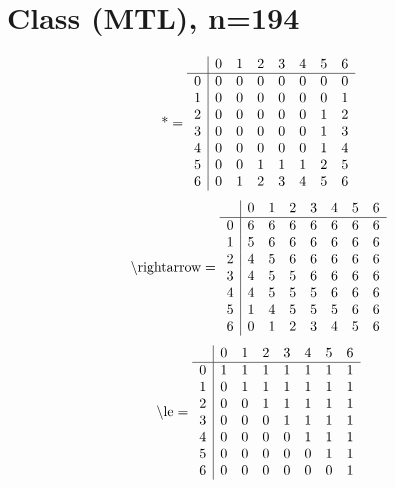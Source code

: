 \documentclass[11pt]{article}
\begin{document}
\section{Class (MTL), n=194}
\[\text{*} = 
\begin{array}{r | r r r r r r r}
 & 0 & 1 & 2 & 3 & 4 & 5 & 6 \\ \hline
0 & 0 & 0 & 0 & 0 & 0 & 0 & 0 \\
1 & 0 & 0 & 0 & 0 & 0 & 0 & 1 \\
2 & 0 & 0 & 0 & 0 & 0 & 1 & 2 \\
3 & 0 & 0 & 0 & 0 & 0 & 1 & 3 \\
4 & 0 & 0 & 0 & 0 & 0 & 1 & 4 \\
5 & 0 & 0 & 1 & 1 & 1 & 2 & 5 \\
6 & 0 & 1 & 2 & 3 & 4 & 5 & 6 \\
\end{array}
\]
\[\text{\textbackslash rightarrow} = 
\begin{array}{r | r r r r r r r}
 & 0 & 1 & 2 & 3 & 4 & 5 & 6 \\ \hline
0 & 6 & 6 & 6 & 6 & 6 & 6 & 6 \\
1 & 5 & 6 & 6 & 6 & 6 & 6 & 6 \\
2 & 4 & 5 & 6 & 6 & 6 & 6 & 6 \\
3 & 4 & 5 & 5 & 6 & 6 & 6 & 6 \\
4 & 4 & 5 & 5 & 5 & 6 & 6 & 6 \\
5 & 1 & 4 & 5 & 5 & 5 & 6 & 6 \\
6 & 0 & 1 & 2 & 3 & 4 & 5 & 6 \\
\end{array}
\]
\[\text{\textbackslash le} = 
\begin{array}{r | r r r r r r r}
 & 0 & 1 & 2 & 3 & 4 & 5 & 6 \\ \hline
0 & 1 & 1 & 1 & 1 & 1 & 1 & 1 \\
1 & 0 & 1 & 1 & 1 & 1 & 1 & 1 \\
2 & 0 & 0 & 1 & 1 & 1 & 1 & 1 \\
3 & 0 & 0 & 0 & 1 & 1 & 1 & 1 \\
4 & 0 & 0 & 0 & 0 & 1 & 1 & 1 \\
5 & 0 & 0 & 0 & 0 & 0 & 1 & 1 \\
6 & 0 & 0 & 0 & 0 & 0 & 0 & 1 \\
\end{array}
\]
\end{document}
